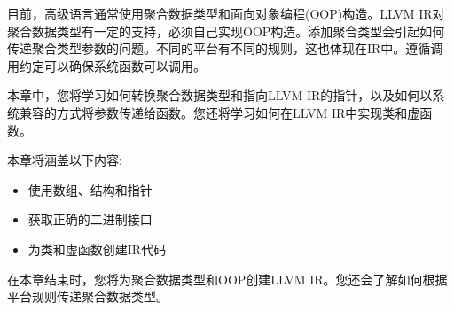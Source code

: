 目前，高级语言通常使用聚合数据类型和面向对象编程(OOP)构造。LLVM IR对聚合数据类型有一定的支持，必须自己实现OOP构造。添加聚合类型会引起如何传递聚合类型参数的问题。不同的平台有不同的规则，这也体现在IR中。遵循调用约定可以确保系统函数可以调用。\par

本章中，您将学习如何转换聚合数据类型和指向LLVM IR的指针，以及如何以系统兼容的方式将参数传递给函数。您还将学习如何在LLVM IR中实现类和虚函数。\par

本章将涵盖以下内容:\par

\begin{itemize}
	\item 使用数组、结构和指针
	\item 获取正确的二进制接口
	\item 为类和虚函数创建IR代码
\end{itemize}

在本章结束时，您将为聚合数据类型和OOP创建LLVM IR。您还会了解如何根据平台规则传递聚合数据类型。\par































